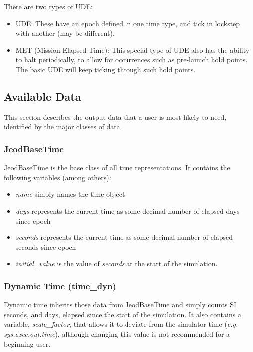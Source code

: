 There are two types of UDE:


\begin{itemize}
\item UDE:  These have an epoch defined in one time type, and tick in
lockstep with another (may be different).
\item MET (Mission Elapsed Time):  This special type of UDE also has the
ability to halt periodically, to allow for occurrences such as
pre-launch hold points.  The basic UDE will keep ticking through such
hold points.
\end{itemize}



\subsection{Available Data}
This section describes the output data that a user is most likely to
need, identified by the major classes of data.

\subsubsection{JeodBaseTime}
JeodBaseTime is the base class of all time representations.  It contains the
following variables (among others):

\begin{itemize}
\item {\textit{name}} simply names the time object
\item {\textit{days}} represents the current time as some decimal number of elapsed days since epoch
\item {\textit{seconds}} represents the current time as some decimal number of elapsed seconds since epoch
\item {\textit{initial\_value}} is the value of \textit{seconds} at the start of the simulation.
\end{itemize}

\subsubsection[Dynamic Time (time\_dyn)]{Dynamic Time (time\_dyn)}
Dynamic time inherits those data from JeodBaseTime and simply counts SI seconds,
and days, elapsed since the start of the simulation.  It also contains
a variable, \textit{scale\_factor}, that allows it to deviate from the
simulator time (\textit{e.g. sys.exec.out.time}), although changing
this value is not recommended for a beginning user.

